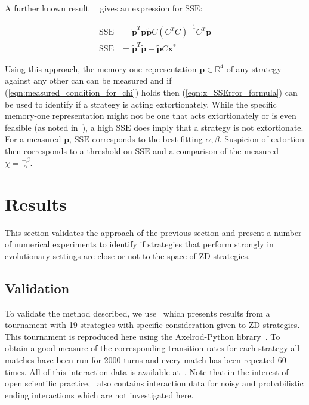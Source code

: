 \documentclass[10pt,letterpaper]{article}
\newcommand{\SSe}{\text{SSE}}
\begin{document}
A further known result~~\cite{kutner2004applied, rao1973linear,
wakefield2013bayesian} gives an expression for
\(\SSe\):

\begin{align}\label{eqn:x_SSError_formula}
    \SSe &= {\tilde{\textbf{p}}} ^ T \tilde{\textbf{p}}
           \tilde{\textbf{p}} C \left(C ^ T C \right) ^ {-1} C ^ T
           \tilde{\textbf{p}} \\
    \SSe &={\tilde{\textbf{p}}} ^ T \tilde{\textbf{p}} - \tilde{\textbf{p}} C \textbf{x}^*
\end{align}

Using this approach, the memory-one representation \(\textbf{p}\in\mathbb{R}^4\) of any
strategy against any other can can be measured and if
(\ref{eqn:measured_condition_for_chi}) holds then (\ref{eqn:x_SSError_formula})
can be used to identify if a strategy is acting extortionately. While the
specific memory-one representation might not be one that acts extortionately or
is even feasible (as noted in~\cite{Press2012}), a
high \(\SSe\) does imply that a strategy is not extortionate. For a measured
\(\textbf{p}\), \(\SSe\) corresponds to the best fitting \(\alpha, \beta\). Suspicion of
extortion then corresponds to a threshold on \(\SSe\) and a comparison of the
measured \(\chi=\frac{-\beta}{\alpha}\).

\section*{Results}

This section validates the approach of the previous section and
present a number of numerical experiments to identify if strategies that perform
strongly in evolutionary settings are close or not to the space of
ZD strategies.

\subsection*{Validation}

To validate the method described, we use~\cite{Stewart2012} which
presents results from a tournament with
19 strategies
with specific consideration given to ZD strategies. This
tournament is reproduced here using the Axelrod-Python
library~\cite{Knight2016}. To obtain a good measure of the corresponding
transition rates for each strategy all matches have been run for
2000 turns and every match has been
repeated 60 times. All of this
interaction data is available at~\cite{vincent_knight_2018_1297075}. Note that
in the interest of open scientific practice,~\cite{vincent_knight_2018_1297075}
also contains interaction data for noisy and probabilistic ending interactions
which are not investigated here.
\end{document}
